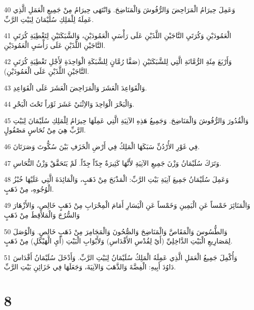 \par 40 وَعَمِلَ حِيرَامُ الْمَرَاحِضَ وَالرُّفُوشَ وَالْمَنَاضِحَ. وَانْتَهَى حِيرَامُ مِنْ جَمِيعِ الْعَمَلِ الَّذِي عَمِلَهُ لِلْمَلِكِ سُلَيْمَانَ لِبَيْتِ الرَّبِّ.
\par 41 الْعَمُودَيْنِ وَكُرَتَيِ التَّاجَيْنِ اللَّذَيْنِ عَلَى رَأْسَيِ الْعَمُودَيْنِ، وَالشَّبَكَتَيْنِ لِتَغْطِيَةِ كُرَتَيِ التَّاجَيْنِ اللَّذَيْنِ عَلَى رَأْسَيِ الْعَمُودَيْنِ.
\par 42 وَأَرْبَعَ مِئَةِ الرُّمَّانَةِ الَّتِي لِلشَّبَكَتَيْنِ (صَفَّا رُمَّانٍ لِلشَّبَكَةِ الْوَاحِدَةِ لأَجْلِ تَغْطِيَةِ كُرَتَيِ التَّاجَيْنِ اللَّذَيْنِ عَلَى الْعَمُودَيْنِ).
\par 43 وَالْقَوَاعِدَ الْعَشَرَ وَالْمَرَاحِضَ الْعَشَرَ عَلَى الْقَوَاعِدِ.
\par 44 وَالْبَحْرَ الْوَاحِدَ وَالاِثْنَيْ عَشَرَ ثَوْراً تَحْتَ الْبَحْرِ.
\par 45 وَالْقُدُورَ وَالرُّفُوشَ وَالْمَنَاضِحَ. وَجَمِيعُ هَذِهِ الآنِيَةِ الَّتِي عَمِلَهَا حِيرَامُ لِلْمَلِكِ سُلَيْمَانَ لِبَيْتِ الرَّبِّ هِيَ مِنْ نُحَاسٍ مَصْقُولٍ.
\par 46 فِي غَوْرِ الأُرْدُنِّ سَبَكَهَا الْمَلِكُ فِي أَرْضِ الْخَزَفِ بَيْنَ سُكُّوتَ وَصَرَتَانَ.
\par 47 وَتَرَكَ سُلَيْمَانُ وَزْنَ جَمِيعِ الآنِيَةِ لأَنَّهَا كَثِيرَةٌ جِدّاً جِدّاً. لَمْ يَتَحَقَّقْ وَزْنُ النُّحَاسِ.
\par 48 وَعَمِلَ سُلَيْمَانُ جَمِيعَ آنِيَةِ بَيْتِ الرَّبِّ: الْمَذْبَحَ مِنْ ذَهَبٍ، وَالْمَائِدَةَ الَّتِي عَلَيْهَا خُبْزُ الْوُجُوهِ، مِنْ ذَهَبٍ.
\par 49 وَالْمَنَائِرَ خَمْساً عَنِ الْيَمِينِ وَخَمْساً عَنِ الْيَسَارِ أَمَامَ الْمِحْرَابِ مِنْ ذَهَبٍ خَالِصٍ، وَالأَزْهَارَ وَالسُّرُجَ وَالْمَلاَقِطَ مِنْ ذَهَبٍ
\par 50 وَالطُّسُوسَ وَالْمَقَاصَّ وَالْمَنَاضِحَ وَالصُّحُونَ وَالْمَجَامِرَ مِنْ ذَهَبٍ خَالِصٍ. وَالْوُصَلَ لِمَصَارِيعِ الْبَيْتِ الدَّاخِلِيِّ (أَيْ لِقُدْسِ الأَقْدَاسِ) وَلأَبْوَابِ الْبَيْتِ (أَيِ الْهَيْكَلِ) مِنْ ذَهَبٍ.
\par 51 وَأُكْمِلَ جَمِيعُ الْعَمَلِ الَّذِي عَمِلَهُ الْمَلِكُ سُلَيْمَانُ لِبَيْتِ الرَّبِّ. وَأَدْخَلَ سُلَيْمَانُ أَقْدَاسَ دَاوُدَ أَبِيهِ: الْفِضَّةَ وَالذَّهَبَ وَالآنِيَةَ، وَجَعَلَهَا فِي خَزَائِنِ بَيْتِ الرَّبِّ.

\chapter{8}

